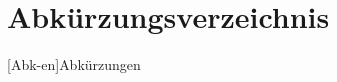 
\chapter*{Abkürzungsverzeichnis}                   %

\begin{acronym}[DHBW]

 [Abk-en]{Abkürzungen}

\end{acronym}
